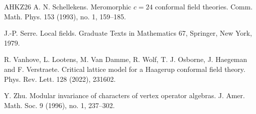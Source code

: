 \documentclass[leqno]{article}
\numberwithin{equation}{section}
\begin{document}
\begin{thebibliography}{AHKZ26}
A. N. Schellekens.
\newblock Meromorphic $c = 24$ conformal field theories.
\newblock Comm. Math. Phys. 153 (1993), no. 1, 159--185.

J.-P. Serre.
\newblock Local fields.
\newblock Graduate Texts in Mathematics 67, Springer, New York, 1979.

R. Vanhove, L. Lootens, M. Van Damme, R. Wolf, T. J. Osborne, J. Haegeman and F. Verstraete.
\newblock Critical lattice model for a Haagerup conformal field theory.
\newblock Phys. Rev. Lett. 128 (2022), 231602.

Y. Zhu.
\newblock Modular invariance of characters of vertex operator algebras.
\newblock J. Amer. Math. Soc. 9 (1996), no. 1, 237--302.

\end{thebibliography}
\end{document}
